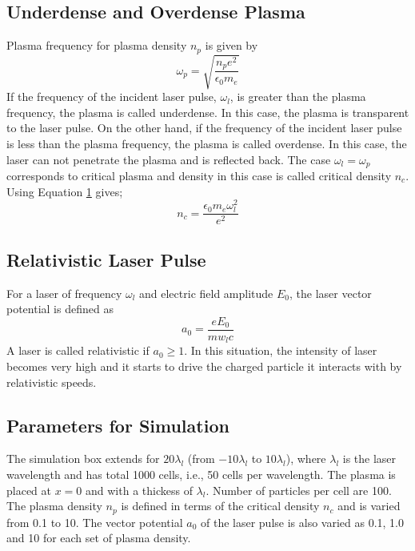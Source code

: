 \documentclass[]{article}
\begin{document}
\subsection{Underdense and Overdense Plasma}
Plasma frequency for plasma density $n_p$ is given by\cite{chen}
\begin{equation}\label{plasma-frequency}
    \omega_p = \sqrt{\frac{n_p e^2}{\epsilon_0 m_e}}
\end{equation}
If the frequency of the incident laser pulse, $\omega_l$, is greater than the plasma frequency, the plasma is called underdense. In this case, the plasma is transparent to the laser pulse. On the other hand, if the frequency of the incident laser pulse is less than the plasma frequency, the plasma is called overdense. In this case, the laser can not penetrate the plasma and is reflected back. The case $\omega_l = \omega_p$ corresponds to critical plasma and density in this case is called critical density $n_c$. Using Equation \hyperref[plasma-frequency]{1} gives;
\begin{equation}\label{critical-density}
    n_c = \frac{\epsilon_0 m_e \omega_l^2}{e^2}
\end{equation}
\subsection{Relativistic Laser Pulse}
For a laser of frequency $\omega_l$ and electric field amplitude $E_0$, the laser vector potential is defined as
\begin{equation}\label{vector_potential}
    a_0 = \frac{eE_0}{m w_l c}
\end{equation}
A laser is called relativistic if $a_0 \ge 1$. In this situation, the intensity of laser becomes very high and it starts to drive the charged particle it interacts with by relativistic speeds.

\subsection{Parameters for Simulation}
The simulation box extends for $20 \lambda _l$ (from $-10 \lambda _l$ to $10 \lambda _l$), where $\lambda_l$ is the laser wavelength and has total 1000 cells, i.e., 50 cells per wavelength. The plasma is placed at $x=0$ and with a thickess of $\lambda_l$. Number of particles per cell are 100.  The plasma density $n_p$ is defined in terms of the critical density $n_c$ and is varied from 0.1 to 10. The vector potential $a_0$ of the laser pulse is also varied as 0.1, 1.0 and 10 for each set of plasma density.
\end{document}
